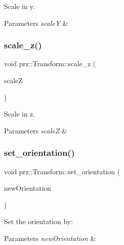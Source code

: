 Scale in y. 


\begin{DoxyParams}{Parameters}
{\em scaleY} & \\
\hline
\end{DoxyParams}
\mbox{\label{classprz_1_1_transform_a89e8432dcde698da7dbf125e5260363e}} 
\subsubsection{\texorpdfstring{scale\_z()}{scale\_z()}}
{\footnotesize\ttfamily void prz\+::\+Transform\+::scale\+\_\+z (\begin{DoxyParamCaption}\item[{float}]{scaleZ }\end{DoxyParamCaption})}



Scale in z. 


\begin{DoxyParams}{Parameters}
{\em scaleZ} & \\
\hline
\end{DoxyParams}
\mbox{\label{classprz_1_1_transform_a742cfd3728bfda05c88eca51a1c4d094}} 
\subsubsection{\texorpdfstring{set\_orientation()}{set\_orientation()}\hspace{0.1cm}{\footnotesize\ttfamily [1/2]}}
{\footnotesize\ttfamily void prz\+::\+Transform\+::set\+\_\+orientation (\begin{DoxyParamCaption}\item[{const P\+Quat \&}]{new\+Orientation }\end{DoxyParamCaption})}



Set the orientation by\+: 


\begin{DoxyParams}{Parameters}
{\em new\+Orientation} & \\
\hline
\end{DoxyParams}
\mbox{\label{classprz_1_1_transform_a9fb424ad34746fad71d7138ceb467841}} 
